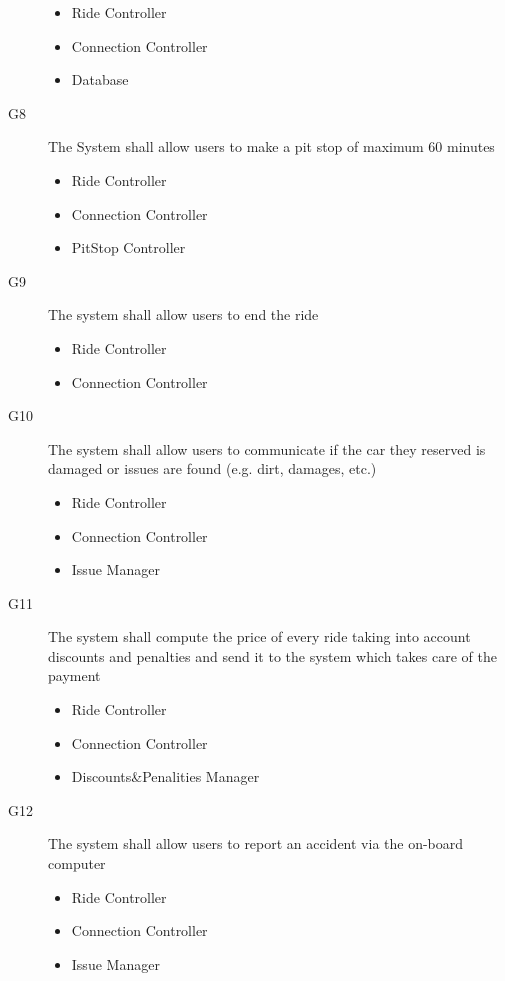\documentclass{article}
\begin{document}
\begin{flushleft}
\begin{description}
\begin{itemize}
\item Ride Controller
\item Connection Controller
\item Database
\end{itemize}
\item [G8] The System shall allow users to make a pit stop of maximum 60 minutes
\begin{itemize}
\item Ride Controller
\item Connection Controller
\item PitStop Controller
\end{itemize}
\item [G9] The system shall allow users to end the ride 
\begin{itemize}
\item Ride Controller
\item Connection Controller
\end{itemize}
\item [G10] The system shall allow users to communicate if the car they reserved is damaged or issues are found (e.g. dirt, damages, etc.)
\begin{itemize}
\item Ride Controller
\item Connection Controller
\item Issue Manager
\end{itemize}
\item [G11] The system shall compute the price of every ride taking into account discounts and penalties and send it to the system which takes care of the payment
\begin{itemize}
\item Ride Controller
\item Connection Controller
\item Discounts\&Penalities Manager
\end{itemize}
\item [G12] The system shall allow users to report an accident via the on-board computer
\begin{itemize}
\item Ride Controller
\item Connection Controller
\item Issue Manager
\end{itemize}



\end{description}
\end{flushleft}
\end{document}
